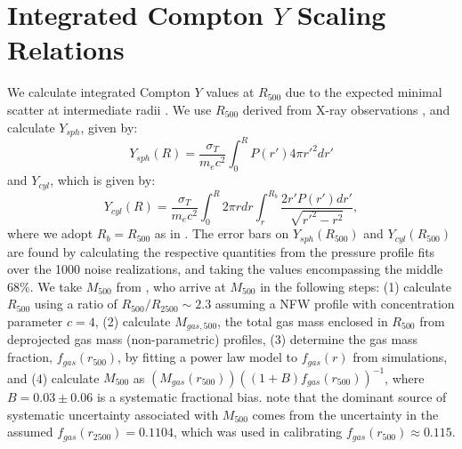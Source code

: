 \documentclass[iop,numberedappendix,apj]{emulateapj}
\begin{document}


\section{Integrated Compton $Y$ Scaling Relations}


We calculate integrated Compton $Y$ values at $R_{500}$ due to the expected minimal scatter at intermediate 
radii \citep[e.g.][]{kravtsov2012}. We use $R_{500}$ derived from X-ray observations \citep{mantz2010}, 
and calculate $Y_{sph}$, given by:
\begin{equation}
  Y_{sph}(R) = \frac{\sigma_T}{m_e c^2} \int_0^R P(r') 4 \pi r'^2 dr' 
  \label{eqn:ysph}
\end{equation}
and $Y_{cyl}$, which is given by:
\begin{equation}
  Y_{cyl}(R) = \frac{\sigma_T}{m_e c^2} \int_0^R  2 \pi r dr \int_r^{R_b} \frac{2 r' P(r') dr'}{\sqrt{r'^2 - r^2}},
  \label{eqn:ycyl}
\end{equation}
where we adopt $R_b = R_{500}$ as in .
The error bars on $Y_{sph}(R_{500})$ and $Y_{cyl}(R_{500})$ are found by calculating the respective quantities 
from the pressure profile fits over the 1000 noise realizations, and taking the values encompassing the middle 68\%. 
We take $M_{500}$ from \citet{mantz2010}, who arrive at $M_{500}$ in the following steps: (1) calculate $R_{500}$ using 
a ratio of $R_{500} / R_{2500} \sim 2.3$ assuming a NFW profile with concentration parameter $c=4$, (2) calculate 
$M_{gas,500}$, the total gas mass enclosed in $R_{500}$ from deprojected gas mass (non-parametric) profiles, (3) 
determine the gas mass fraction, $f_{gas}(r_{500})$, by fitting a power law model to $f_{gas}(r)$ from simulations, and (4)
calculate $M_{500}$ as $(M_{gas}(r_{500})) ((1+B) f_{gas}(r_{500}))^{-1}$, where $B = 0.03 \pm 0.06$ is a systematic fractional 
bias. \citet{mantz2010} note that the dominant source of systematic uncertainty associated with $M_{500}$ comes from the 
uncertainty in the assumed $f_{gas}(r_{2500}) = 0.1104$, which was used in calibrating $f_{gas}(r_{500}) \approx 0.115$.
\end{document}
